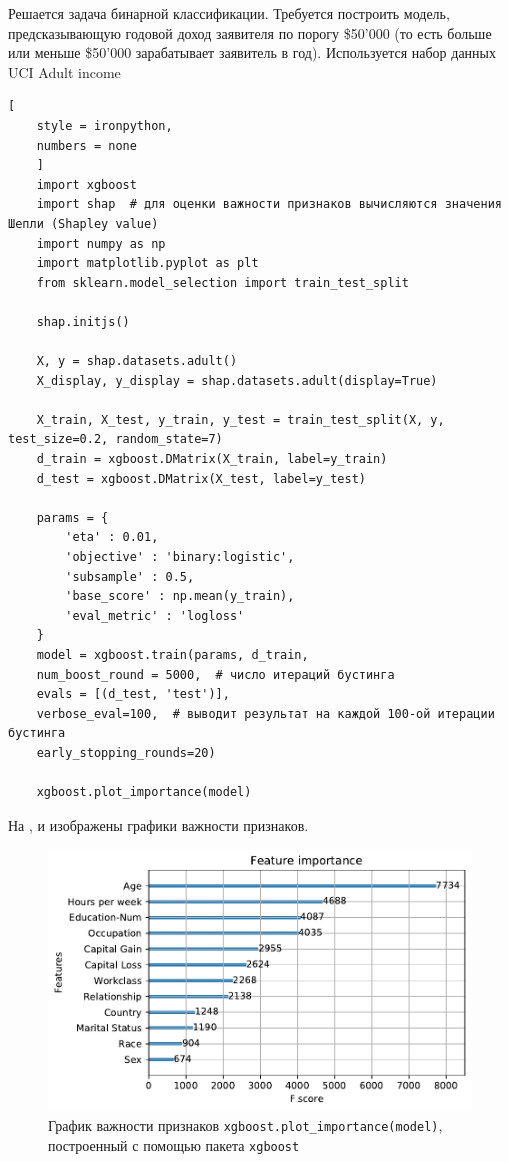 \documentclass[%
	11pt,
	a4paper,
	utf8,
		]{article}
\begin{document}
Решается задача бинарной классификации. Требуется построить модель, предсказывающую годовой доход заявителя по порогу \$50'000 (то есть больше или меньше \$50'000 зарабатывает заявитель в год). Используется набор данных  UCI Adult income

\begin{lstlisting}[
	style = ironpython,
	numbers = none
	]
	import xgboost
	import shap  # для оценки важности признаков вычисляются значения Шепли (Shapley value)
	import numpy as np
	import matplotlib.pyplot as plt
	from sklearn.model_selection import train_test_split
	
	shap.initjs()
	
	X, y = shap.datasets.adult()
	X_display, y_display = shap.datasets.adult(display=True)
	
	X_train, X_test, y_train, y_test = train_test_split(X, y, test_size=0.2, random_state=7)
	d_train = xgboost.DMatrix(X_train, label=y_train)
	d_test = xgboost.DMatrix(X_test, label=y_test)
	
	params = {
		'eta' : 0.01,
		'objective' : 'binary:logistic',
		'subsample' : 0.5,
		'base_score' : np.mean(y_train),
		'eval_metric' : 'logloss'        
	}
	model = xgboost.train(params, d_train,
	num_boost_round = 5000,  # число итераций бустинга
	evals = [(d_test, 'test')],
	verbose_eval=100,  # выводит результат на каждой 100-ой итерации бустинга
	early_stopping_rounds=20)
	
	xgboost.plot_importance(model)
\end{lstlisting}

На ,  и  изображены графики важности признаков.

\begin{figure}[h]
	\centering
	\includegraphics[scale=0.75]{figures/xgboost_plot.pdf}
	\caption{График важности признаков \lstinline{xgboost.plot_importance(model)},\\построенный с помощью пакета \texttt{xgboost} }\label{fig:xgboost_plot}
\end{figure}
\end{document}
